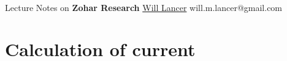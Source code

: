\documentclass[11pt]{article}
\begin{document}
\thispagestyle{empty}
\bigskip \
\vspace{0.1cm}

\begin{center}
{\fontsize{22}{22} \selectfont Lecture Notes on}
\vskip 16pt
{\fontsize{36}{36} \selectfont \bf \sffamily Zohar Research}
\vskip 24pt
{\fontsize{18}{18} \selectfont \rmfamily \href{https://will-lancer.github.io}{Will Lancer}}
\vskip 6pt
{\fontsize{14}{14} \selectfont \ttfamily will.m.lancer@gmail.com}
\vskip 24pt
\end{center}

{\parindent0pt \baselineskip=15.5pt}
\noin

\newpage
\microtoc
\newpage

\section{Calculation of current}
\end{document}
